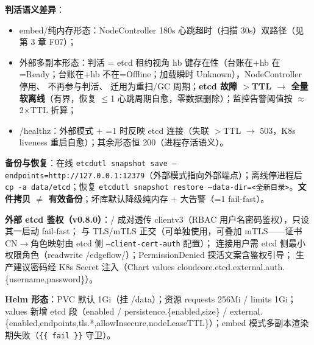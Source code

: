 \textbf{判活语义差异}：

\begin{itemize}
  \item embed/纯内存形态：NodeController 180s 心跳超时（扫描 30s）双路径（见第 3 章 F07）；
  \item 外部多副本形态：判活 = etcd 租约视角 hb 键存在性（台账在+hb 在=Ready；台账在+hb 不在=Offline；加载瞬时 Unknown），NodeController 停用、 不再参与判活、 迁用为重扫/GC 周期；\textbf{etcd 故障 $>$TTL $\rightarrow$ 全量软离线}（有界，恢复 $\leq$1 心跳周期自愈，零数据删除）；监控告警阈值按 $\approx$2×TTL 折算；
  \item /healthz：外部模式 + =1 时反映 etcd 连接（失联 $>$TTL $\rightarrow$ 503，K8s liveness 重启自愈）；其余形态恒 200（进程存活语义）。
\end{itemize}

\textbf{备份与恢复}：在线 \texttt{etcdutl snapshot save --endpoints=http://127.0.0.1:12379}（外部模式指向外部端点）；离线停进程后 \texttt{cp -a data/etcd}；恢复 \texttt{etcdutl snapshot restore --data-dir=<全新目录>}。\textbf{文件拷贝 $\neq$ 有效备份}；坏库默认降级纯内存 + 大告警（=1 fail-fast）。

\textbf{外部 etcd 鉴权（v0.8.0）}：/ 成对透传 clientv3（RBAC 用户名密码鉴权），只设其一启动 fail-fast；
与 TLS/mTLS 正交（可单独使用，可叠加 mTLS——证书 CN$\rightarrow$角色映射由 etcd 侧 \texttt{--client-cert-auth} 配置）；
连接用户需 etcd 侧最小权限角色（readwrite /edgeflow/）；PermissionDenied 探活文案含鉴权引导；
生产建议密码经 K8s Secret 注入（Chart values cloudcore.etcd.external.auth.\{username,password\}）。

\textbf{Helm 形态}：PVC 默认 1Gi（挂 /data）；资源 requests 256Mi / limits 1Gi；values 新增 etcd 段（enabled / persistence.\{enabled,size\} / external.\{enabled,endpoints,tls.*,allowInsecure,nodeLeaseTTL\}）；embed 模式多副本渲染期失败（\texttt{\{\{ fail \}\}} 守卫）。
